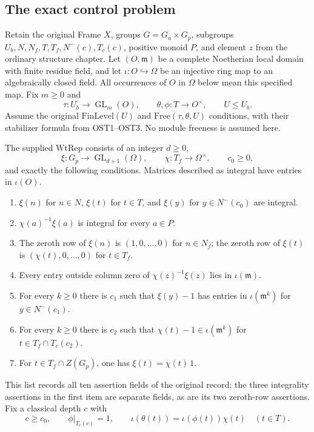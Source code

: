 \documentclass[11pt,a4paper]{article}
\numberwithin{equation}{section}
\theoremstyle{remark}\newtheorem{remark}[theorem]{Remark}
\begin{document}
\subsection{The exact control problem}

Retain the original Frame $X$, groups $G=G_a\times G_p$, subgroups
$U_b,\allowbreak{} N,\allowbreak{} N_f,\allowbreak{} T,\allowbreak{} T_f,\allowbreak{} N^-(c),\allowbreak{} T_c(c)$, positive monoid $P$, and element $z$
from the ordinary structure chapter.  Let $(O,\mathfrak m)$ be a
complete Noetherian local domain with finite residue field, and let
$\iota:O\hookrightarrow\Omega$ be an injective ring map to an
algebraically closed field.  All occurrences of $O$ in $\Omega$ below
mean this specified map.  Fix $m\geq0$ and
\[
 \tau:U_b\longrightarrow\operatorname{GL}_m(O),\qquad
 \theta,\phi:T\longrightarrow O^\times,\qquad U\leq U_b.
\]
Assume the original $\mathrm{FinLevel}(U)$ and
$\mathrm{Free}(\tau,\theta,\allowbreak{} U)$ conditions, with their stabilizer
formula from OST1--OST3.  No module freeness is assumed here.

The supplied $\mathrm{WtRep}$ consists of an integer $d\geq0$,
\[
 \xi:G_p\longrightarrow\operatorname{GL}_{d+1}(\Omega),\qquad
 \chi:T_f\longrightarrow\Omega^\times,\qquad c_0\geq0,
\]
and exactly the following conditions.  Matrices described as integral
have entries in $\iota(O)$.
\begin{enumerate}
\item $\xi(n)$ for $n\in N$, $\xi(t)$ for $t\in T$, and
$\xi(y)$ for $y\in N^-(c_0)$ are integral.
\item $\chi(a)^{-1}\xi(a)$ is integral for every $a\in P$.
\item The zeroth row of $\xi(n)$ is $(1,0,\ldots,0)$ for
$n\in N_f$; the zeroth row of $\xi(t)$ is
$(\chi(t),0,\ldots,0)$ for $t\in T_f$.
\item Every entry outside column zero of
$\chi(z)^{-1}\xi(z)$ lies in $\iota(\mathfrak m)$.
\item For every $k\geq0$ there is $c_1$ such that
$\xi(y)-1$ has entries in $\iota(\mathfrak m^k)$ for
$y\in N^-(c_1)$.
\item For every $k\geq0$ there is $c_2$ such that
$\chi(t)-1\in\iota(\mathfrak m^k)$ for
$t\in T_f\cap T_c(c_2)$.
\item For $t\in T_f\cap Z(G_p)$, one has
$\xi(t)=\chi(t)\,1$.
\end{enumerate}
This list records all ten assertion fields of the original record;
the three integrality assertions in the first item are separate fields,
as are its two zeroth-row assertions.  Fix a classical depth $c$ with
\begin{equation}\label{eq:oct-depth}
 c\geq c_0,\qquad \phi|_{T_c(c)}=1,\qquad
 \iota(\theta(t))=\iota(\phi(t))\chi(t)\quad(t\in T).
\end{equation}
\end{document}
